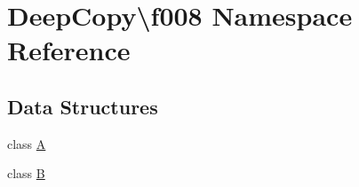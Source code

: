\hypertarget{namespace_deep_copy_1_1f008}{}\section{Deep\+Copy\textbackslash{}f008 Namespace Reference}
\label{namespace_deep_copy_1_1f008}
\subsection*{Data Structures}
\begin{DoxyCompactItemize}
\item 
class \mbox{\hyperlink{class_deep_copy_1_1f008_1_1_a}{A}}
\item 
class \mbox{\hyperlink{class_deep_copy_1_1f008_1_1_b}{B}}
\end{DoxyCompactItemize}
